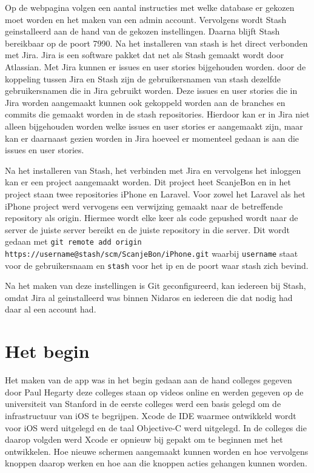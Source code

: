 \documentclass[a4paper,11pt,oneside]{report}
\begin{document}
Op de webpagina volgen een aantal instructies met welke database er gekozen moet
worden en het maken van een admin account. Vervolgens wordt Stash geinstalleerd
aan de hand van de gekozen instellingen. Daarna blijft Stash bereikbaar op de
poort 7990. Na het installeren van stash is het direct verbonden met Jira. Jira
is een software pakket dat net als Stash gemaakt wordt door Atlassian. Met Jira
kunnen er issues en user stories bijgehouden worden. door de koppeling tussen
Jira en Stash zijn de gebruikersnamen van stash dezelfde gebruikersnamen die in
Jira gebruikt worden. Deze issues en user stories die in Jira worden aangemaakt
kunnen ook gekoppeld worden aan de branches en commits die gemaakt worden in de
stash repositories. Hierdoor kan er in Jira niet alleen bijgehouden worden welke
issues en user stories er aangemaakt zijn, maar kan er daarnaast gezien worden
in Jira hoeveel er momenteel gedaan is aan die issues en user stories.

Na het installeren van Stash, het verbinden met Jira en vervolgens het inloggen
kan er een project aangemaakt worden. Dit project heet ScanjeBon en in het
project staan twee repositories iPhone en Laravel. Voor zowel het Laravel als
het iPhone project werd vervogens een verwijzing gemaakt naar de betreffende
repository als origin. Hiermee wordt elke keer als code gepushed wordt naar de
server de juiste server bereikt en de juiste repository in die server. Dit wordt
gedaan met \lstinline[style=code-block]|git remote add origin https://username@stash/scm/ScanjeBon/iPhone.git|
waarbij \lstinline[style=code-block]|username| staat voor de gebruikersnaam en
\lstinline[style=code-block]|stash| voor het ip en de poort waar stash zich
bevind.

Na het maken van deze instellingen is Git geconfigureerd, kan iedereen bij
Stash, omdat Jira al geinstalleerd was binnen Nidaros en iedereen die dat nodig
had daar al een account had.


\section{Het begin}
Het maken van de app was in het begin gedaan aan de hand colleges gegeven door
Paul Hegarty deze colleges staan op videos online en werden gegeven op de
universiteit van Stanford in de eerste colleges werd een basis gelegd om de
infrastructuur van iOS te begrijpen. Xcode de IDE waarmee ontwikkeld wordt voor
iOS werd uitgelegd en de taal Objective-C werd uitgelegd. In de colleges die
daarop volgden werd Xcode er opnieuw bij gepakt om te beginnen met het
ontwikkelen. Hoe nieuwe schermen aangemaakt kunnen worden en hoe vervolgens
knoppen daarop werken en hoe aan die knoppen acties gehangen kunnen worden.
\end{document}
